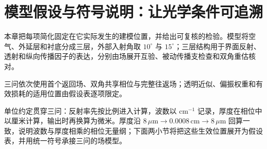 \section{模型假设与符号说明：让光学条件可追溯}

本章把每项简化固定在它实际发生的建模位置，并给出可复核的检验。模型将空气、外延层和衬底分成三层，外部入射角取 $10^\circ$ 与 $15^\circ$；三层结构用于界面反射、透射和纵向传播因子的表达，分别由场展开互验、被动传播支检查和双角重估核对。

三问依次使用首个返回场、双角共享相位与完整往返场；透明近似、偏振权重和有效损耗的适用位置由假设表逐项限定。

单位约定贯穿三问：反射率先按比例进入计算，波数以 $\mathrm{cm}^{-1}$ 记录，厚度在相位中以厘米计算，输出时再换算为微米。厚度沿 $8\,\mu\mathrm{m}\rightarrow0.0008\,\mathrm{cm}\rightarrow8\,\mu\mathrm{m}$ 回算一致，说明波数与厚度相乘的相位无量纲；下面两小节将把这些生效位置展开为假设表，并用统一符号承接三问的场模型。
